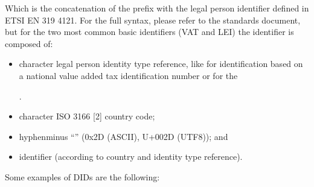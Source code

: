 \documentclass[a4paper,12pt,english,openany]{sphinxmanual}
\begin{document}
\begin{sphinxVerbatim}[commandchars=\\\{\}]
   
\end{sphinxVerbatim}

\sphinxAtStartPar
Which is the concatenation of the prefix  with the legal person identifier defined in ETSI EN 319 412\sphinxhyphen{}1. For the full syntax, please refer to the standards document, but for the two most common basic identifiers (VAT and LEI) the identifier is composed of:
\begin{itemize}
\item {} 
 character legal person identity type reference, like  for identification based on a national value added tax identification number or  for the %
\begin{footnote}[6]\sphinxAtStartFootnote
{}
%
\end{footnote}.

\item {} 
 character ISO 3166 {[}2{]} country code;

\item {} 
\sphinxAtStartPar
hyphen\sphinxhyphen{}minus “\sphinxhyphen{}” (0x2D (ASCII), U+002D (UTF\sphinxhyphen{}8)); and

\item {} 
\sphinxAtStartPar
identifier (according to country and identity type reference).

\end{itemize}

\sphinxAtStartPar
Some examples of DIDs are the following:
\end{document}
